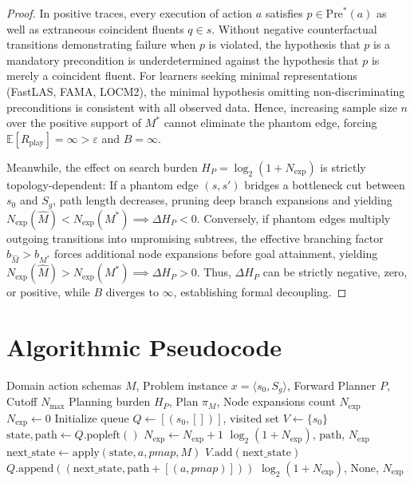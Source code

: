 \documentclass[11pt,a4paper]{article}
\theoremstyle{definition}
\begin{document}
\begin{proof}
In positive traces, every execution of action $a$ satisfies $p \in \text{Pre}^*(a)$ as well as extraneous coincident fluents $q \in s$. Without negative counterfactual transitions demonstrating failure when $p$ is violated, the hypothesis that $p$ is a mandatory precondition is underdetermined against the hypothesis that $p$ is merely a coincident fluent. For learners seeking minimal representations (FastLAS, FAMA, LOCM2), the minimal hypothesis omitting non-discriminating preconditions is consistent with all observed data. Hence, increasing sample size $n$ over the positive support of $M^*$ cannot eliminate the phantom edge, forcing $\mathbb{E}[R_{\text{play}}] = \infty > \varepsilon$ and $B = \infty$.

Meanwhile, the effect on search burden $H_P = \log_2(1 + N_{\text{exp}})$ is strictly topology-dependent:
If a phantom edge $(s, s')$ bridges a bottleneck cut between $s_0$ and $S_g$, path length decreases, pruning deep branch expansions and yielding $N_{\text{exp}}(\widehat{M}) < N_{\text{exp}}(M^*) \implies \Delta H_P < 0$.
Conversely, if phantom edges multiply outgoing transitions into unpromising subtrees, the effective branching factor $b_{\widehat{M}} > b_{M^*}$ forces additional node expansions before goal attainment, yielding $N_{\text{exp}}(\widehat{M}) > N_{\text{exp}}(M^*) \implies \Delta H_P > 0$.
Thus, $\Delta H_P$ can be strictly negative, zero, or positive, while $B$ diverges to $\infty$, establishing formal decoupling.
\end{proof}

\section{Algorithmic Pseudocode}

\begin{algorithm}[h!]
\caption{Measurement of Planning Burden $H_P$}
\begin{algorithmic}[1]
\Require Domain action schemas $M$, Problem instance $x = \langle s_0, S_g \rangle$, Forward Planner $P$, Cutoff $N_{\text{max}}$
\Ensure Planning burden $H_P$, Plan $\pi_M$, Node expansions count $N_{\text{exp}}$
\State $N_{\text{exp}} \gets 0$
\State Initialize queue $Q \gets [(s_0, [])]$, visited set $V \gets \{s_0\}$
    \State $\text{state}, \text{path} \gets Q.\text{popleft}()$
    \State $N_{\text{exp}} \gets N_{\text{exp}} + 1$
        \State \Return $\log_2(1 + N_{\text{exp}})$, $\text{path}$, $N_{\text{exp}}$
    \EndIf
        \State $\text{next\_state} \gets \text{apply}(\text{state}, a, pmap, M)$
            \State $V.\text{add}(\text{next\_state})$
            \State $Q.\text{append}((\text{next\_state}, \text{path} + [(a, pmap)]))$
        \EndIf
    \EndFor
\EndWhile
\State \Return $\log_2(1 + N_{\text{exp}})$, $\text{None}$, $N_{\text{exp}}$ 
\end{algorithmic}
\end{algorithm}
\end{document}
